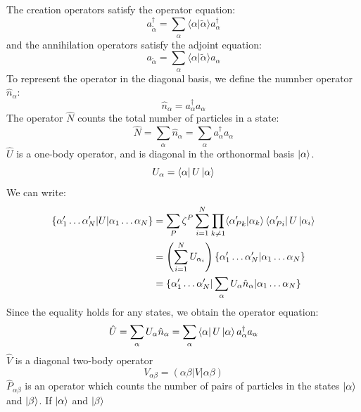\documentclass[12pt]{article}
\begin{document}
The creation operators satisfy the operator equation:
\begin{equation*}
    a^\dagger_{\tilde{\alpha}}=\sum_\alpha\langle\alpha|\tilde{\alpha}\rangle a_\alpha^\dagger
\end{equation*}
and the annihilation operators satisfy the adjoint equation:
\begin{equation*}
    a_{\tilde{\alpha}}=\sum_\alpha\langle\alpha|\tilde{\alpha}\rangle a_\alpha
\end{equation*}
To represent the operator in the diagonal basis, we define the numnber operator 
$\hat{n}_\alpha$:
\begin{equation*}
    \hat{n}_\alpha=a^\dagger_\alpha a_\alpha
\end{equation*}
The operator $\hat{N}$ counts the total number of particles in a state:
\begin{equation*}
    \hat{N}=\sum_\alpha\hat{n}_\alpha=\sum_\alpha a^\dagger_\alpha a_\alpha
\end{equation*}
$\hat{U}$ is a one-body operator, and is diagonal in the orthonormal basis 
$\ket{\alpha}$.
\begin{equation*}
    U_\alpha=\bra{\alpha}U\ket{\alpha}
\end{equation*}
We can write:
\begin{equation*}
    \begin{split}
        \{\alpha'_1\dots\alpha'_N|U|\alpha_1\dots\alpha_N\}&=
        \sum_P\zeta^P\sum_{i=1}^N\prod_{k\neq1}\langle\alpha'_{Pk}|\alpha_k\rangle
        \bra{\alpha'_{Pi}}U\ket{\alpha_i}\\
        &=\left(\sum_{i=1}^NU_{\alpha_i}\right)
        \{\alpha'_1\dots\alpha'_N|\alpha_1\dots\alpha_N\}\\
        &=\{\alpha'_1\dots\alpha'_N|\sum_\alpha U_\alpha \hat{n}_\alpha|
        \alpha_1\dots\alpha_N\}
    \end{split}
\end{equation*}
Since the equality holds for any states, we obtain the operator equation:
\begin{equation*}
    \hat{U}=\sum_\alpha U_\alpha\hat{n}_\alpha
    =\sum_\alpha \bra{\alpha}U\ket{\alpha}a^\dagger_\alpha a_\alpha
\end{equation*}
$\hat{V}$ is a diagonal two-body operator
\begin{equation*}
    V_{\alpha\beta}=(\alpha\beta|V|\alpha\beta)
\end{equation*}
$\hat{P}_{\alpha\beta}$ is an operator which counts the number of pairs of particles 
in the states $\ket{\alpha}$ and $\ket{\beta}$. If $\ket{\alpha}$ and $\ket{\beta}$ 
\end{document}

